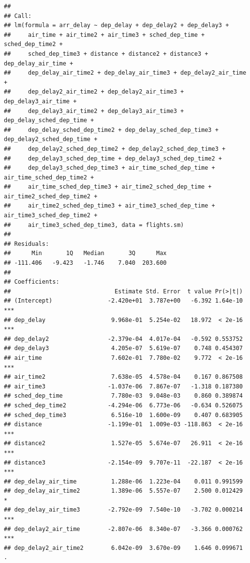 \documentclass[
]{article}
\begin{document}
\begin{verbatim}
## 
## Call:
## lm(formula = arr_delay ~ dep_delay + dep_delay2 + dep_delay3 + 
##     air_time + air_time2 + air_time3 + sched_dep_time + sched_dep_time2 + 
##     sched_dep_time3 + distance + distance2 + distance3 + dep_delay_air_time + 
##     dep_delay_air_time2 + dep_delay_air_time3 + dep_delay2_air_time + 
##     dep_delay2_air_time2 + dep_delay2_air_time3 + dep_delay3_air_time + 
##     dep_delay3_air_time2 + dep_delay3_air_time3 + dep_delay_sched_dep_time + 
##     dep_delay_sched_dep_time2 + dep_delay_sched_dep_time3 + dep_delay2_sched_dep_time + 
##     dep_delay2_sched_dep_time2 + dep_delay2_sched_dep_time3 + 
##     dep_delay3_sched_dep_time + dep_delay3_sched_dep_time2 + 
##     dep_delay3_sched_dep_time3 + air_time_sched_dep_time + air_time_sched_dep_time2 + 
##     air_time_sched_dep_time3 + air_time2_sched_dep_time + air_time2_sched_dep_time2 + 
##     air_time2_sched_dep_time3 + air_time3_sched_dep_time + air_time3_sched_dep_time2 + 
##     air_time3_sched_dep_time3, data = flights.sm)
## 
## Residuals:
##      Min       1Q   Median       3Q      Max 
## -111.406   -9.423   -1.746    7.040  203.600 
## 
## Coefficients:
##                              Estimate Std. Error  t value Pr(>|t|)    
## (Intercept)                -2.420e+01  3.787e+00   -6.392 1.64e-10 ***
## dep_delay                   9.968e-01  5.254e-02   18.972  < 2e-16 ***
## dep_delay2                 -2.379e-04  4.017e-04   -0.592 0.553752    
## dep_delay3                  4.205e-07  5.619e-07    0.748 0.454307    
## air_time                    7.602e-01  7.780e-02    9.772  < 2e-16 ***
## air_time2                   7.638e-05  4.578e-04    0.167 0.867508    
## air_time3                  -1.037e-06  7.867e-07   -1.318 0.187380    
## sched_dep_time              7.780e-03  9.048e-03    0.860 0.389874    
## sched_dep_time2            -4.294e-06  6.773e-06   -0.634 0.526075    
## sched_dep_time3             6.516e-10  1.600e-09    0.407 0.683905    
## distance                   -1.199e-01  1.009e-03 -118.863  < 2e-16 ***
## distance2                   1.527e-05  5.674e-07   26.911  < 2e-16 ***
## distance3                  -2.154e-09  9.707e-11  -22.187  < 2e-16 ***
## dep_delay_air_time          1.288e-06  1.223e-04    0.011 0.991599    
## dep_delay_air_time2         1.389e-06  5.557e-07    2.500 0.012429 *  
## dep_delay_air_time3        -2.792e-09  7.540e-10   -3.702 0.000214 ***
## dep_delay2_air_time        -2.807e-06  8.340e-07   -3.366 0.000762 ***
## dep_delay2_air_time2        6.042e-09  3.670e-09    1.646 0.099671 .  

\end{verbatim}
\end{document}
